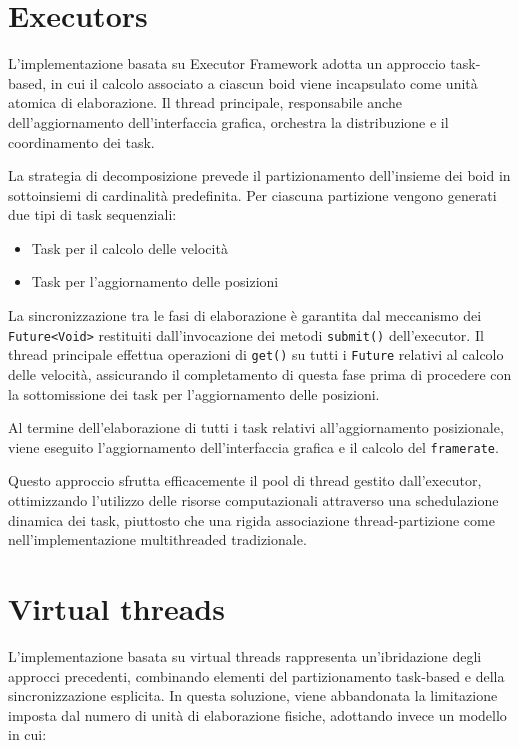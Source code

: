\documentclass[a4paper,12pt]{report}
\begin{document}
\section{Executors}

L'implementazione basata su Executor Framework adotta un approccio task-based, in cui il calcolo associato a ciascun boid viene incapsulato come unità atomica di elaborazione. Il thread principale, responsabile anche dell'aggiornamento dell'interfaccia grafica, orchestra la distribuzione e il coordinamento dei task.

La strategia di decomposizione prevede il partizionamento dell'insieme dei boid in sottoinsiemi di cardinalità predefinita. Per ciascuna partizione vengono generati due tipi di task sequenziali:
\begin{itemize}
    \item Task per il calcolo delle velocità
    \item Task per l'aggiornamento delle posizioni
\end{itemize}

La sincronizzazione tra le fasi di elaborazione è garantita dal meccanismo dei \texttt{Future<Void>} restituiti dall'invocazione dei metodi \texttt{submit()} dell'executor. Il thread principale effettua operazioni di \texttt{get()} su tutti i \texttt{Future} relativi al calcolo delle velocità, assicurando il completamento di questa fase prima di procedere con la sottomissione dei task per l'aggiornamento delle posizioni.

Al termine dell'elaborazione di tutti i task relativi all'aggiornamento posizionale, viene eseguito l'aggiornamento dell'interfaccia grafica e il calcolo del \texttt{framerate}.

Questo approccio sfrutta efficacemente il pool di thread gestito dall'executor, ottimizzando l'utilizzo delle risorse computazionali attraverso una schedulazione dinamica dei task, piuttosto che una rigida associazione thread-partizione come nell'implementazione multithreaded tradizionale.

\section{Virtual threads}
L'implementazione basata su virtual threads rappresenta un'ibridazione degli approcci precedenti, combinando elementi del partizionamento task-based e della sincronizzazione esplicita. In questa soluzione, viene abbandonata la limitazione imposta dal numero di unità di elaborazione fisiche, adottando invece un modello in cui:
\end{document}
